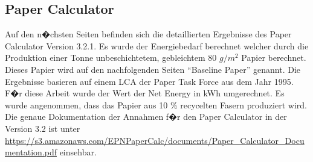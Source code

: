 \documentclass[a4paper,twoside,10pt]{report}
\begin{document}
\begin{appendices}
\chapter{Paper Calculator}\label{anh:paper}
Auf den n�chsten Seiten befinden sich die detaillierten Ergebnisse des Paper Calculator Version 3.2.1. Es wurde der Energiebedarf berechnet welcher durch die Produktion einer Tonne unbeschichtetem, gebleichtem 80 $g/m^2$ Papier berechnet. Dieses Papier wird auf den nachfolgenden Seiten "`Baseline Paper"' genannt. Die Ergebnisse basieren auf einem LCA der Paper Task Force aus dem Jahr 1995. F�r diese Arbeit wurde der Wert der Net Energy in kWh umgerechnet. Es wurde angenommen, dass das Papier aus 10 \% recycelten Fasern produziert wird. Die genaue Dokumentation der Annahmen f�r den Paper Calculator in der Version 3.2 ist unter \url{https://s3.amazonaws.com/EPNPaperCalc/documents/Paper_Calculator_Documentation.pdf} einsehbar.


\cleardoublepage

\end{appendices}
\end{document}
